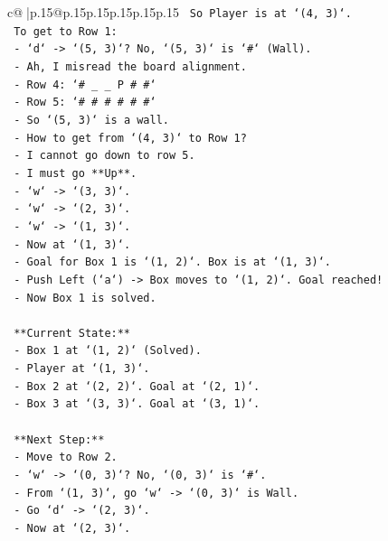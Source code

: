 \documentclass{article}
\begin{document}
{\begin{supertabular}{c@{$\;$}|p{.15\linewidth}@{}p{.15\linewidth}p{.15\linewidth}p{.15\linewidth}p{.15\linewidth}p{.15\linewidth}}
{{{\texttt{        So Player is at `(4, 3)`.} \\
\texttt{        To get to Row 1:} \\
\texttt{        {-} `d` {-}> `(5, 3)`? No, `(5, 3)` is `\#` (Wall).} \\
\texttt{        {-} Ah, I misread the board alignment.} \\
\texttt{        {-} Row 4: `\# \_ \_ P \# \#`} \\
\texttt{        {-} Row 5: `\# \# \# \# \# \#`} \\
\texttt{        {-} So `(5, 3)` is a wall.} \\
\texttt{        {-} How to get from `(4, 3)` to Row 1?} \\
\texttt{        {-} I cannot go down to row 5.} \\
\texttt{        {-} I must go **Up**.} \\
\texttt{        {-} `w` {-}> `(3, 3)`.} \\
\texttt{        {-} `w` {-}> `(2, 3)`.} \\
\texttt{        {-} `w` {-}> `(1, 3)`.} \\
\texttt{        {-} Now at `(1, 3)`.} \\
\texttt{        {-} Goal for Box 1 is `(1, 2)`. Box is at `(1, 3)`.} \\
\texttt{        {-} Push Left (`a`) {-}> Box moves to `(1, 2)`. Goal reached!} \\
\texttt{        {-} Now Box 1 is solved.} \\
\\ 
\texttt{        **Current State:**} \\
\texttt{        {-} Box 1 at `(1, 2)` (Solved).} \\
\texttt{        {-} Player at `(1, 3)`.} \\
\texttt{        {-} Box 2 at `(2, 2)`. Goal at `(2, 1)`.} \\
\texttt{        {-} Box 3 at `(3, 3)`. Goal at `(3, 1)`.} \\
\\ 
\texttt{        **Next Step:**} \\
\texttt{        {-} Move to Row 2.} \\
\texttt{        {-} `w` {-}> `(0, 3)`? No, `(0, 3)` is `\#`.} \\
\texttt{        {-} From `(1, 3)`, go `w` {-}> `(0, 3)` is Wall.} \\
\texttt{        {-} Go `d` {-}> `(2, 3)`.} \\
\texttt{        {-} Now at `(2, 3)`.} \\
}}}
\end{supertabular}}
\end{document}

